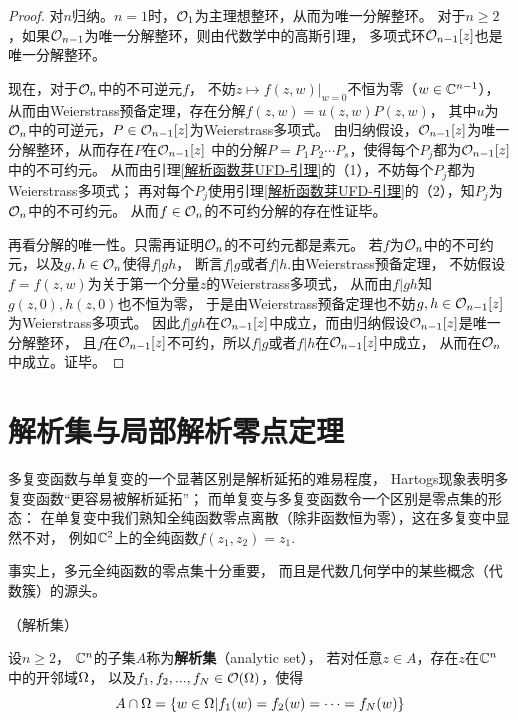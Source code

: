 \begin{proof}
对$n$归纳。$n=1$时，$\mathcal{O}_1$为主理想整环，从而为唯一分解整环。
对于$n\geq 2$，如果$\mathcal{O}_{n-1}$为唯一分解整环，则由代数学中的高斯引理，
多项式环$\mathcal{O}_{n-1}[z]$也是唯一分解整环。

现在，对于$\mathcal{O}_n$中的不可逆元$f$，
不妨$z\mapsto f(z,w)|_{w=0}$不恒为零（$w\in\mathbb{C}^{n-1}$），
从而由Weierstrass预备定理，存在分解$f(z,w)=u(z,w)P(z,w)$，
其中$u$为$\mathcal{O}_n$中的可逆元，$P\in\mathcal{O}_{n-1}[z]$为Weierstrass多项式。
由归纳假设，$\mathcal{O}_{n-1}[z]$为唯一分解整环，从而存在$P$在$\mathcal{O}_{n-1}[z]$
中的分解$P=P_1P_2\cdots P_s$，使得每个$P_j$都为$\mathcal{O}_{n-1}[z]$中的不可约元。
从而由引理\ref{解析函数芽UFD-引理}的（1），不妨每个$P_j$都为Weierstrass多项式；
再对每个$P_j$使用引理\ref{解析函数芽UFD-引理}的（2），知$P_j$为$\mathcal{O}_n$中的不可约元。
从而$f\in\mathcal{O}_n$的不可约分解的存在性证毕。

再看分解的唯一性。只需再证明$\mathcal{O}_n$的不可约元都是素元。
若$f$为$\mathcal{O}_n$中的不可约元，以及$g,h\in\mathcal{O}_n$使得$f|gh$，
断言$f|g$或者$f|h$.由Weierstrass预备定理，
不妨假设$f=f(z,w)$为关于第一个分量$z$的Weierstrass多项式，
从而由$f|gh$知$g(z,0),h(z,0)$也不恒为零，
于是由Weierstrass预备定理也不妨$g,h\in\mathcal{O}_{n-1}[z]$为Weierstrass多项式。
因此$f|gh$在$\mathcal{O}_{n-1}[z]$中成立，而由归纳假设$\mathcal{O}_{n-1}[z]$是唯一分解整环，
且$f$在$\mathcal{O}_{n-1}[z]$不可约，所以$f|g$或者$f|h$在$\mathcal{O}_{n-1}[z]$中成立，
从而在$\mathcal{O}_n$中成立。证毕。
\end{proof}

\section{解析集与局部解析零点定理}
多复变函数与单复变的一个显著区别是解析延拓的难易程度，
Hartogs现象表明多复变函数“更容易被解析延拓”；
而单复变与多复变函数令一个区别是零点集的形态：
在单复变中我们熟知全纯函数零点离散（除非函数恒为零），这在多复变中显然不对，
例如$\mathbb{C}^2$上的全纯函数$f(z_1,z_2)=z_1$.

事实上，多元全纯函数的零点集十分重要，
而且是代数几何学中的某些概念（代数簇）的源头。

\begin{definition}（解析集）

设$n\geq 2$， $\mathbb{C}^n$的子集$A$称为\textbf{解析集}（analytic set），
若对任意$z\in A$，存在$z$在$\mathbb{C}^n$中的开邻域$\Omega$，
以及$f_1,f_2,...,f_N\in\mathcal{O}(\Omega)$，使得
$$A\cap\Omega=\{w\in\Omega|f_1(w)=f_2(w)=\cdots=f_N(w)\}$$
\end{definition}

